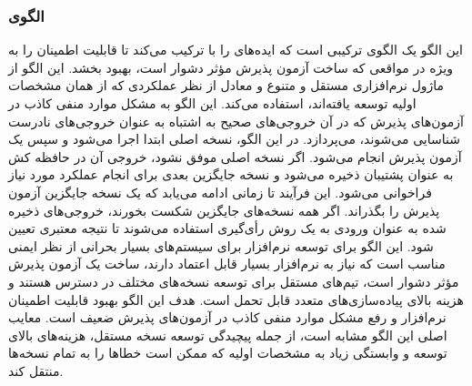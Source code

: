 \subsubsection{الگوی }
\label{ArmoushSWRecoverBlockBackVotSec}
\begin{RTL}
این الگو یک الگوی ترکیبی است که ایده‌های 
را با  ترکیب می‌کند تا قابلیت
اطمینان را به ویژه در مواقعی که ساخت آزمون پذیرش مؤثر
دشوار است، بهبود بخشد. این الگو از  ماژول
نرم‌افزاری مستقل و متنوع و معادل از نظر عملکردی
که از همان مشخصات اولیه توسعه یافته‌اند،
استفاده می‌کند. این الگو به مشکل موارد منفی کاذب در آزمون‌های
پذیرش که در آن خروجی‌های صحیح به اشتباه به عنوان خروجی‌های نادرست
شناسایی می‌شوند، می‌پردازد. در این الگو، نسخه اصلی ابتدا
اجرا می‌شود و سپس یک آزمون پذیرش انجام می‌شود.
اگر نسخه اصلی موفق نشود، خروجی آن در حافظه کش به عنوان
پشتیبان ذخیره می‌شود و نسخه جایگزین بعدی برای انجام عملکرد
مورد نیاز فراخوانی می‌شود. این فرآیند تا زمانی ادامه می‌یابد
که یک نسخه جایگزین آزمون پذیرش را بگذراند. اگر همه نسخه‌های جایگزین
شکست بخورند، خروجی‌های ذخیره شده به عنوان ورودی به یک روش رأی‌گیری
استفاده می‌شوند تا نتیجه معتبری تعیین شود.
این الگو برای توسعه نرم‌افزار برای سیستم‌های بسیار بحرانی از نظر ایمنی مناسب است
که نیاز به نرم‌افزار بسیار قابل اعتماد دارند، ساخت یک آزمون پذیرش
مؤثر دشوار است، تیم‌های مستقل برای توسعه نسخه‌های مختلف در
دسترس هستند و هزینه بالای پیاده‌سازی‌های متعدد قابل تحمل است.
هدف این الگو بهبود قابلیت اطمینان نرم‌افزار و رفع مشکل موارد
منفی کاذب در آزمون‌های پذیرش ضعیف است.
معایب اصلی این الگو مشابه  است،
از جمله پیچیدگی توسعه  نسخه‌ مستقل، هزینه‌های بالای توسعه و
وابستگی زیاد به مشخصات اولیه که ممکن است خطاها
را به تمام نسخه‌ها منتقل کند.
\end{RTL}